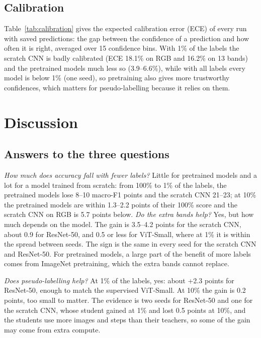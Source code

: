 \documentclass[conference]{IEEEtran}
\newcommand{\tabdir}{../results/tables}
\begin{document}
\subsection{Calibration}\label{sec:calibration}
Table~\ref{tab:calibration} gives the expected calibration error (ECE) of every run with saved predictions: the gap between the confidence of a prediction and how often it is right, averaged over 15 confidence bins. With 1\% of the labels the scratch CNN is badly calibrated (ECE 18.1\% on RGB and 16.2\% on 13 bands) and the pretrained models much less so (3.9--6.6\%), while with all labels every model is below 1\% (one seed), so pretraining also gives more trustworthy confidences, which matters for pseudo-labelling because it relies on them.



\section{Discussion}\label{sec:discussion}
\subsection{Answers to the three questions}
\emph{How much does accuracy fall with fewer labels?} Little for pretrained models and a lot for a model trained from scratch: from 100\% to 1\% of the labels, the pretrained models lose 8--10 macro-F1 points and the scratch CNN 21--23; at 10\% the pretrained models are within 1.3--2.2 points of their 100\% score and the scratch CNN on RGB is 5.7 points below.
\emph{Do the extra bands help?} Yes, but how much depends on the model. The gain is 3.5--4.2 points for the scratch CNN, about 0.9 for ResNet-50, and 0.5 or less for ViT-Small, where at 1\% it is within the spread between seeds. The sign is the same in every seed for the scratch CNN and ResNet-50. For pretrained models, a large part of the benefit of more labels comes from ImageNet pretraining, which the extra bands cannot replace.

\emph{Does pseudo-labelling help?} At 1\% of the labels, yes: about +2.3 points for ResNet-50, enough to match the supervised ViT-Small. At 10\% the gain is 0.2 points, too small to matter. The evidence is two seeds for ResNet-50 and one for the scratch CNN, whose student gained at 1\% and lost 0.5 points at 10\%, and the students use more images and steps than their teachers, so some of the gain may come from extra compute.
\end{document}
